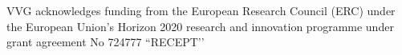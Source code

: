 VVG acknowledges funding from the European Research Council (ERC) under the European Union's Horizon 2020 research and innovation programme under grant agreement No 724777 ``RECEPT’'
